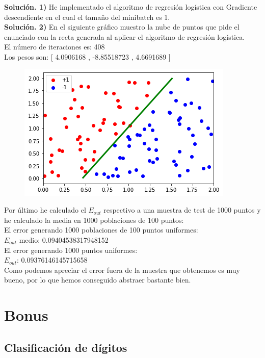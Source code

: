 \documentclass[a4paper,11pt]{article}
\begin{document}
\textbf{Solución. 1)} He implementado el algoritmo de regresión logística con Gradiente descendiente en el cual el tamaño del minibatch es 1.\\

\textbf{Solución. 2)} En el siguiente gráfico muestro la nube de puntos que pide el enunciado con la recta generada al aplicar el algoritmo de regresión logística.\\ 

El número de iteraciones es:  408\\
Los pesos son:  [ 4.0906168 , -8.85518723 , 4.6691689 ]

\begin{figure}[h]
\includegraphics[scale=0.7]{ej2b2}
\centering
\end{figure}

Por último he calculado el $E_{out}$ respectivo a una muestra de test de 1000 puntos y he calculado la media en 1000 poblaciones de 100 puntos:\\

El error generando 1000 poblaciones de 100 puntos uniformes:\\ 
$E_{out}$ medio:  0.09404538317948152\\
El error generando 1000 puntos uniformes:\\
$E_{out}$:  0.09376146145715658\\

Como podemos apreciar el error fuera de la muestra que obtenemos es muy bueno, por lo que hemos conseguido abstraer bastante bien.

\section{Bonus}

\subsection{Clasificación de dígitos}
\end{document}
